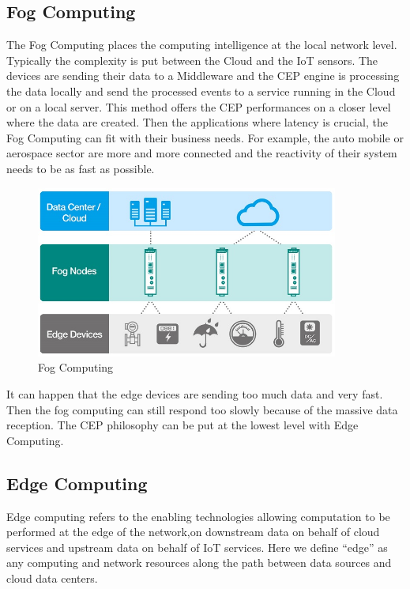 \documentclass[11pt]{article}
\begin{document}

\subsection{Fog Computing}

The Fog Computing places the computing intelligence at the local network level. Typically the complexity is put between the Cloud and the IoT sensors. The devices are sending their data to a Middleware and the CEP engine is processing the data locally and send the processed events to a service running in the Cloud or on a local server. This method offers the CEP performances on a closer level where the data are created. Then the applications where latency is crucial, the Fog Computing can fit with their business needs. For example, the auto mobile or aerospace sector are more and more connected and the reactivity of their system needs to be as fast as possible.
\newline
\begin{figure}[H]
	\includegraphics[width=\textwidth,height=160pt]{assets/Fog_Computing.jpg}
	\caption{Fog Computing}
	\label{fig:Fog-Computing}
\end{figure}

It can happen that the edge devices are sending too much data and very fast. Then the fog computing can still respond too slowly because of the massive data reception. The CEP philosophy can be put at the lowest level with Edge Computing.


\subsection{Edge Computing}

Edge computing refers to the enabling technologies allowing computation to be performed at the edge of the network,on downstream data on behalf of cloud services and upstream data on behalf of IoT services. Here we define “edge” as any computing and network resources along the path between data sources and cloud data centers.\cite{Edge Computing - Vision and Challenges}
\end{document}
